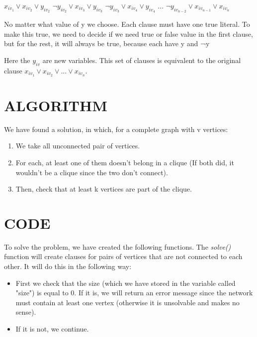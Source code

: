 \documentclass[table]{article}
\begin{document}
\begin{center}
$x_{iv_1} \lor x_{iv_2} \lor y_{iv_2} $ \newline
$\neg y_{iv_2} \lor x_{iv_3} \lor y_{iv_3} $ \newline
$\neg y_{iv_3} \lor x_{iv_4} \lor y_{iv_4} $ \newline
... \newline
$\neg y_{iv_{n-2}} \lor x_{iv_{n-1}} \lor x_{iv_n} $ \newline
\end{center}

No matter what value of y we choose. Each clause must have one true literal. To make this true, we need to decide if we need true or false value in the first clause, but for the rest, it will always be true, because each have y and ¬y

\leftskip=0.5in 
Here the $y_{iv}$ are new variables. This set of clauses is equivalent to the original clause $x_{iv_1} \lor x_{iv_2} \lor ... \lor x_{iv_n} $.

\leftskip=0.0in  
\section{ALGORITHM}

\leftskip=0.5in  
We have found a solution, in which, for a complete graph with v vertices:
\begin{enumerate}\leftskip=0.8in 
\item We take all unconnected pair of vertices.
\item For each, at least one of them doesn't belong in a clique (If both did, it wouldn't be a clique since the two don't connect).
\item Then, check that at least k vertices are part of the clique.
\end{enumerate}

\leftskip=0.0in  
\section{CODE}

\leftskip=0.5in  
To solve the problem, we have created the following functions.
The \textit{solve()} function will create clauses for pairs of vertices that are not connected to each other. It will do this in the following way: \newline

\begin{itemize}\leftskip=0.8in
\item First we check that the size (which we have stored in the variable called "size") is equal to 0. If it is, we will return an error message since the network must contain at least one vertex (otherwise it is unsolvable and makes no sense).
\item If it is not, we continue.
\end{itemize}
 
\end{document}
